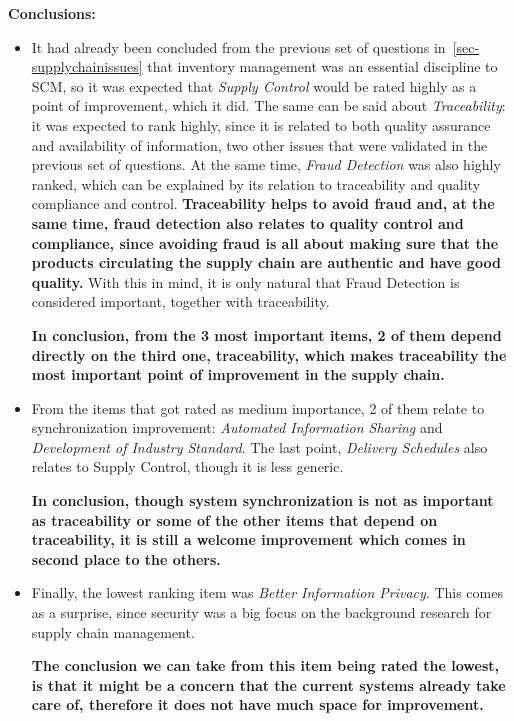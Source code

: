 \par \textbf{Conclusions: }
\begin{itemize}

    \item It had already been concluded from the previous set of questions in~\ref{sec-supplychainissues} that inventory management was an essential discipline to SCM, so it was expected that \textit{Supply Control} would be rated highly as a point of improvement, which it did. The same can be said about \textit{Traceability}: it was expected to rank highly, since it is related to both quality assurance and availability of information, two other issues that were validated in the previous set of questions. At the same time, \textit{Fraud Detection} was also highly ranked, which can be explained by its relation to traceability and quality compliance and control. \textbf{Traceability helps to avoid fraud and, at the same time, fraud detection also relates to quality control and compliance, since avoiding fraud is all about making sure that the products circulating the supply chain are authentic and have good quality.} With this in mind, it is only natural that Fraud Detection is considered important, together with traceability.

\textbf{In conclusion, from the 3 most important items, 2 of them depend directly on the third one, traceability, which makes traceability the most important point of improvement in the supply chain.}

\item From the items that got rated as medium importance, 2 of them relate to synchronization improvement: \textit{Automated Information Sharing} and \textit{Development of Industry Standard}. The last point, \textit{Delivery Schedules} also relates to Supply Control, though it is less generic.

\textbf{In conclusion, though system synchronization is not as important as traceability or some of the other items that depend on traceability, it is still a welcome improvement which comes in second place to the others.}


\item Finally, the lowest ranking item was \textit{Better Information Privacy}. This comes as a surprise, since security was a big focus on the background research for supply chain management. 

\textbf{The conclusion we can take from this item being rated the lowest, is that it might be a concern that the current systems already take care of, therefore it does not have much space for improvement.}
\end{itemize}


